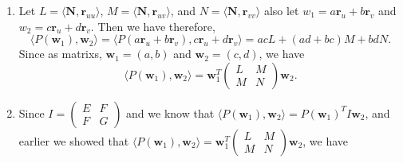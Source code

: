 \documentclass[12pt]{article}
\begin{document}
\begin{enumerate}
  \item %
        Let \(L = \langle \mathbf{N}, \mathbf{r}_{uu} \rangle\), \(M = \langle \mathbf{N}, \mathbf{r}_{uv} \rangle\), and \(N = \langle \mathbf{N}, \mathbf{r}_{vv} \rangle\)
        also let \(w_1=a\mathbf{r}_u + b\mathbf{r}_v\) and \(w_2=c\mathbf{r}_u + d\mathbf{r}_v\). Then we have
        therefore,
        \[
          \langle P(\mathbf{w}_1), \mathbf{w}_2 \rangle = \langle P(a\mathbf{r}_u + b\mathbf{r}_v), c\mathbf{r}_u + d\mathbf{r}_v \rangle = acL + (ad+bc)M + bdN.
        \]
        Since as matrixs, \(\mathbf{w}_1 = (a,b)\) and \(\mathbf{w}_2 = (c,d)\), we have
        \[
          \langle P(\mathbf{w}_1), \mathbf{w}_2 \rangle = \mathbf{w}_1^T \begin{pmatrix} L & M \\ M & N\end{pmatrix} \mathbf{w}_2.
        \]
  \item Since \(I = \begin{pmatrix}
          E & F \\ F & G
        \end{pmatrix}\) and we know that \(
        \langle P(\mathbf{w}_1), \mathbf{w}_2 \rangle = P(\mathbf{w}_1)^T I \mathbf{w}_2\),  and earlier
        we showed that \(\langle P(\mathbf{w}_1), \mathbf{w}_2 \rangle = \mathbf{w}_1^T \begin{pmatrix} L & M \\ M & N\end{pmatrix} \mathbf{w}_2\), we have

\end{enumerate}
\end{document}

